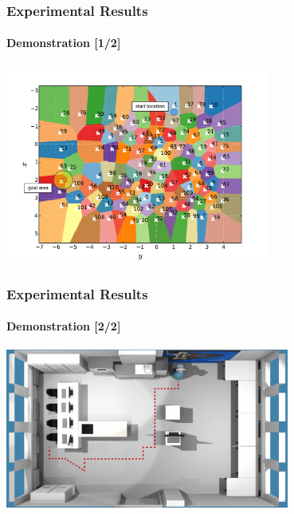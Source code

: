\begin{frame}
	\frametitle{Experimental Results}
	\framesubtitle{Demonstration [1/2]}
	\vspace{-15pt}
	\begin{center}
		\hspace{7pt}\includegraphics[width=0.65\textwidth]{figures/implementation/demo_clustering_v2.pdf}
	\end{center}
\end{frame}

\begin{frame}
	\frametitle{Experimental Results}
	\framesubtitle{Demonstration [2/2]}
	\begin{center}
		\includegraphics[width=0.7\textwidth]{figures/implementation/tum_kitchen_render_trajectory_v8_high}
	\end{center}
\end{frame}

